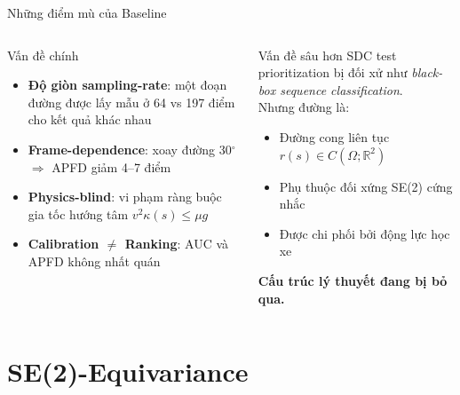 \documentclass[aspectratio=169,10pt]{beamer}
\begin{document}
\begin{frame}{Những điểm mù của Baseline}
\begin{columns}[T]
\begin{alertblock}{Vấn đề chính}
\scriptsize
\begin{itemize}
  \item \textbf{Độ giòn sampling-rate}: một đoạn đường được lấy mẫu ở 64 vs 197 điểm cho kết quả khác nhau
  \item \textbf{Frame-dependence}: xoay đường 30$^\circ$ $\Rightarrow$ APFD giảm 4--7 điểm
  \item \textbf{Physics-blind}: vi phạm ràng buộc gia tốc hướng tâm $v^2 \kappa(s) \le \mu g$
  \item \textbf{Calibration $\ne$ Ranking}: AUC và APFD không nhất quán
\end{itemize}
\end{alertblock}

\begin{block}{Vấn đề sâu hơn}
\scriptsize
SDC test prioritization bị đối xử như \emph{black-box sequence classification}. \\[4pt]
Nhưng đường là:
\begin{itemize}
  \item Đường cong liên tục $r(s) \in C(\Omega; \mathbb{R}^2)$
  \item Phụ thuộc đối xứng SE(2) cứng nhắc
  \item Được chi phối bởi động lực học xe
\end{itemize}
\textbf{Cấu trúc lý thuyết đang bị bỏ qua.}
\end{block}
\end{columns}
\end{frame}

\section{SE(2)-Equivariance}
\end{document}
